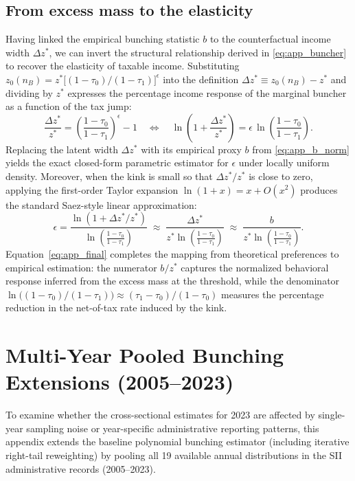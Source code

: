 \subsection{From excess mass to the elasticity}
Having linked the empirical bunching statistic $b$ to the counterfactual income width $\Delta z^*$, we can invert the structural relationship derived in \eqref{eq:app_buncher} to recover the elasticity of taxable income. Substituting $z_0(n_B) = z^*\bigl[(1-\tau_0)/(1-\tau_1)\bigr]^{\epsilon}$ into the definition $\Delta z^* \equiv z_0(n_B) - z^*$ and dividing by $z^*$ expresses the percentage income response of the marginal buncher as a function of the tax jump:
\begin{equation}
\frac{\Delta z^{*}}{z^{*}} = \left(\frac{1-\tau_0}{1-\tau_1}\right)^{\epsilon} - 1
\quad\Longleftrightarrow\quad
\ln\left(1+\frac{\Delta z^{*}}{z^{*}}\right) = \epsilon\,\ln\left(\frac{1-\tau_0}{1-\tau_1}\right).
\label{eq:app_log}
\end{equation}
Replacing the latent width $\Delta z^*$ with its empirical proxy $b$ from \eqref{eq:app_b_norm} yields the exact closed-form parametric estimator for $\epsilon$ under locally uniform density. Moreover, when the kink is small so that $\Delta z^*/z^*$ is close to zero, applying the first-order Taylor expansion $\ln(1+x) = x + O(x^2)$ produces the standard Saez-style linear approximation:
\begin{equation}
\epsilon = \frac{\ln\left(1+\Delta z^{*}/z^{*}\right)}{\ln\left(\frac{1-\tau_0}{1-\tau_1}\right)}
\;\approx\;
\frac{\Delta z^{*}}{z^{*}\ln\left(\frac{1-\tau_0}{1-\tau_1}\right)}
\;\approx\;
\frac{b}{z^{*}\ln\left(\frac{1-\tau_0}{1-\tau_1}\right)}.
\label{eq:app_final}
\end{equation}
Equation~\eqref{eq:app_final} completes the mapping from theoretical preferences to empirical estimation: the numerator $b/z^*$ captures the normalized behavioral response inferred from the excess mass at the threshold, while the denominator $\ln\bigl((1-\tau_0)/(1-\tau_1)\bigr) \approx (\tau_1 - \tau_0)/(1-\tau_0)$ measures the percentage reduction in the net-of-tax rate induced by the kink.


\section{Multi-Year Pooled Bunching Extensions (2005--2023)}
\label{app:pooled_bunching}

To examine whether the cross-sectional estimates for 2023 are affected by single-year sampling noise or year-specific administrative reporting patterns, this appendix extends the baseline polynomial bunching estimator (including iterative right-tail reweighting) by pooling all 19 available annual distributions in the SII administrative records (2005--2023).

